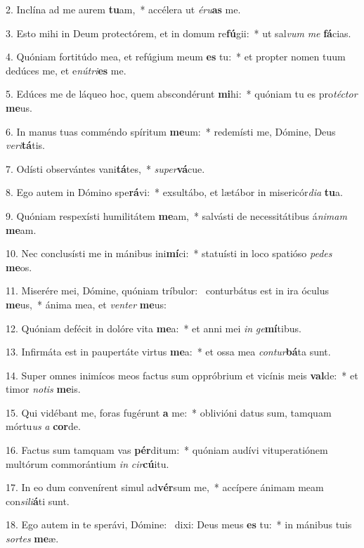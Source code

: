 2. Inclína ad me aurem \textbf{tu}am,~*  accélera ut \textit{é}\textit{ru}\textbf{as} me.\

3. Esto mihi in Deum protectórem, et in domum re\textbf{fú}gii:~*  ut sal\textit{vum} \textit{me} \textbf{fá}cias.\

4. Quóniam fortitúdo mea, et refúgium meum \textbf{es} tu:~*  et propter nomen tuum dedúces me, et e\textit{nú}\textit{tri}\textbf{es} me.\

5. Edúces me de láqueo hoc, quem abscondérunt \textbf{mi}hi:~*  quóniam tu es pro\textit{téc}\textit{tor} \textbf{me}us.\

6. In manus tuas comméndo spíritum \textbf{me}um:~*  redemísti me, Dómine, Deus \textit{ve}\textit{ri}\textbf{tá}tis.\

7. Odísti observántes vani\textbf{tá}tes,~*  \textit{su}\textit{per}\textbf{vá}cue.\

8. Ego autem in Dómino spe\textbf{rá}vi:~*  exsultábo, et lætábor in misericór\textit{di}\textit{a} \textbf{tu}a.\

9. Quóniam respexísti humilitátem \textbf{me}am,~*  salvásti de necessitátibus á\textit{ni}\textit{mam} \textbf{me}am.\

10. Nec conclusísti me in mánibus ini\textbf{mí}ci:~*  statuísti in loco spatióso \textit{pe}\textit{des} \textbf{me}os.\

11. Miserére mei, Dómine, quóniam tríbulor: \dag\  conturbátus est in ira óculus \textbf{me}us,~*  ánima mea, et \textit{ven}\textit{ter} \textbf{me}us:\

12. Quóniam defécit in dolóre vita \textbf{me}a:~*  et anni mei \textit{in} \textit{ge}\textbf{mí}tibus.\

13. Infirmáta est in paupertáte virtus \textbf{me}a:~*  et ossa mea \textit{con}\textit{tur}\textbf{bá}ta sunt.\

14. Super omnes inimícos meos factus sum oppróbrium et vicínis meis \textbf{val}de:~*  et timor \textit{no}\textit{tis} \textbf{me}is.\

15. Qui vidébant me, foras fugérunt \textbf{a} me:~*  oblivióni datus sum, tamquam mórtu\textit{us} \textit{a} \textbf{cor}de.\

16. Factus sum tamquam vas \textbf{pér}ditum:~*  quóniam audívi vituperatiónem multórum commorántium \textit{in} \textit{cir}\textbf{cú}itu.\

17. In eo dum convenírent simul ad\textbf{vér}sum me,~*  accípere ánimam meam con\textit{si}\textit{li}\textbf{á}ti sunt.\

18. Ego autem in te sperávi, Dómine: \dag\  dixi: Deus meus \textbf{es} tu:~*  in mánibus tuis \textit{sor}\textit{tes} \textbf{me}æ.\

